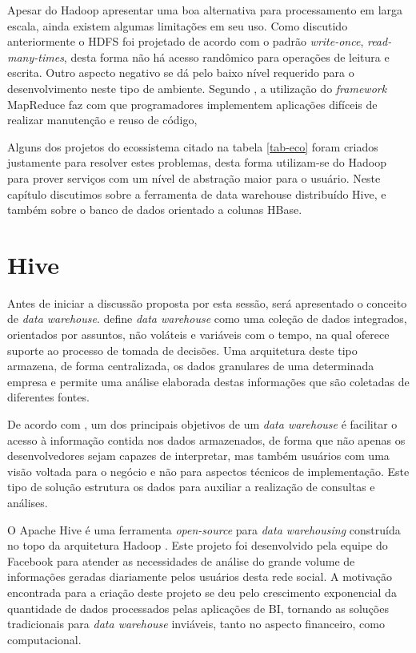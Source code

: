 Apesar do Hadoop apresentar uma boa alternativa para processamento em larga escala, ainda existem algumas limitações em seu uso. Como discutido anteriormente o HDFS foi projetado de acordo com o padrão \textit{write-once}, \textit{read-many-times}, desta forma não há acesso randômico para operações de leitura e escrita. Outro aspecto negativo se dá pelo baixo nível requerido para o desenvolvimento neste tipo de ambiente. Segundo , a utilização do \textit{framework} MapReduce faz com que programadores implementem aplicações difíceis de realizar manutenção e reuso de código,

Alguns dos projetos do ecossistema citado na tabela \ref{tab-eco} foram criados justamente para resolver estes problemas, desta forma utilizam-se do Hadoop para prover serviços com um nível de abstração maior para o usuário. Neste capítulo discutimos sobre a ferramenta de data warehouse distribuído Hive, e também sobre o banco de dados orientado a colunas HBase.

\section{Hive}

Antes de iniciar a discussão proposta por esta sessão, será apresentado o conceito de \textit{data warehouse}.  define \textit{data warehouse} como uma coleção de dados integrados, orientados por assuntos, não voláteis e variáveis com o tempo, na qual oferece suporte ao processo de tomada de decisões. Uma arquitetura deste tipo armazena, de forma centralizada, os dados granulares de uma determinada empresa e permite uma análise elaborada destas informações que são coletadas de diferentes fontes.

De acordo com , um dos principais objetivos de um \textit{data warehouse} é facilitar o acesso à informação contida nos dados armazenados, de forma que não apenas os desenvolvedores sejam capazes de interpretar, mas também usuários com uma visão voltada para o negócio e não para aspectos técnicos de implementação. Este tipo de solução estrutura os dados para auxiliar a realização de consultas e análises.

O Apache Hive é uma ferramenta \textit{open-source} para \textit{data warehousing} construída no topo da arquitetura  Hadoop \cite{thusoo2009}. Este projeto foi desenvolvido pela equipe do Facebook para atender as necessidades de análise do grande volume de informações geradas diariamente pelos usuários desta rede social. A motivação encontrada para a criação deste projeto se deu pelo crescimento exponencial da quantidade de dados processados pelas aplicações de BI, tornando as soluções tradicionais para \textit{data warehouse} inviáveis, tanto no aspecto financeiro, como computacional.

